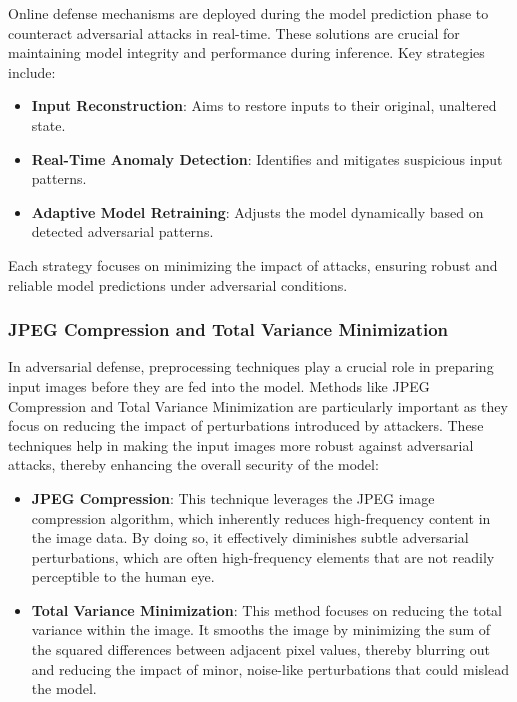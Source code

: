 \documentclass[letterpaper,twocolumn,10pt]{article}
\begin{document}
Online defense mechanisms are deployed during the model prediction phase to counteract adversarial attacks in real-time. These solutions are crucial for maintaining model integrity and performance during inference. Key strategies include:
\begin{itemize}
    \item \textbf{Input Reconstruction}: Aims to restore inputs to their original, unaltered state.
    \item \textbf{Real-Time Anomaly Detection}: Identifies and mitigates suspicious input patterns.
    \item \textbf{Adaptive Model Retraining}: Adjusts the model dynamically based on detected adversarial patterns.
\end{itemize}
Each strategy focuses on minimizing the impact of attacks, ensuring robust and reliable model predictions under adversarial conditions.

\subsubsection{JPEG Compression and Total Variance Minimization}

In adversarial defense, preprocessing techniques play a crucial role in preparing input images before they are fed into the model. Methods like JPEG Compression and Total Variance Minimization are particularly important as they focus on reducing the impact of perturbations introduced by attackers. These techniques help in making the input images more robust against adversarial attacks, thereby enhancing the overall security of the model:

\begin{itemize}
    \item \textbf{JPEG Compression}: This technique leverages the JPEG image compression algorithm, which inherently reduces high-frequency content in the image data. By doing so, it effectively diminishes subtle adversarial perturbations, which are often high-frequency elements that are not readily perceptible to the human eye.
    
    \item \textbf{Total Variance Minimization}: This method focuses on reducing the total variance within the image. It smooths the image by minimizing the sum of the squared differences between adjacent pixel values, thereby blurring out and reducing the impact of minor, noise-like perturbations that could mislead the model.
\end{itemize}
\end{document}
